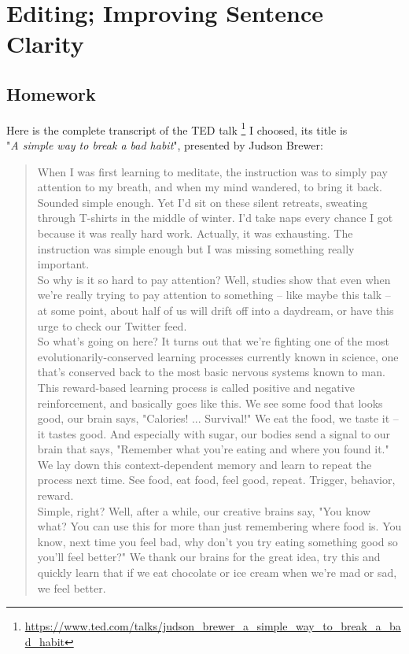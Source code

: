 
\chapter{Editing; Improving Sentence Clarity}

\section{Homework}

Here is the complete transcript of the TED talk
\footnote{\url{https://www.ted.com/talks/judson_brewer_a_simple_way_to_break_a_bad_habit}}
I choosed, its title is \\
"\emph{A simple way to break a bad habit}", presented by Judson Brewer:
\begin{quote}
When I was first learning to meditate, the instruction was to simply pay attention to my breath, and when my mind wandered, to bring it back.\\
Sounded simple enough. Yet I'd sit on these silent retreats, sweating through T-shirts in the middle of winter. I'd take naps every chance I got because it was really hard work. Actually, it was exhausting. The instruction was simple enough but I was missing something really important.\\
So why is it so hard to pay attention? Well, studies show that even when we're really trying to pay attention to something -- like maybe this talk -- at some point, about half of us will drift off into a daydream, or have this urge to check our Twitter feed.\\
So what's going on here? It turns out that we're fighting one of the most evolutionarily-conserved learning processes currently known in science, one that's conserved back to the most basic nervous systems known to man.\\
This reward-based learning process is called positive and negative reinforcement, and basically goes like this. We see some food that looks good, our brain says, "Calories! ... Survival!" We eat the food, we taste it -- it tastes good. And especially with sugar, our bodies send a signal to our brain that says, "Remember what you're eating and where you found it." We lay down this context-dependent memory and learn to repeat the process next time. See food, eat food, feel good, repeat. Trigger, behavior, reward.\\
Simple, right? Well, after a while, our creative brains say, "You know what? You can use this for more than just remembering where food is. You know, next time you feel bad, why don't you try eating something good so you'll feel better?" We thank our brains for the great idea, try this and quickly learn that if we eat chocolate or ice cream when we're mad or sad, we feel better.\\

\end{quote}
